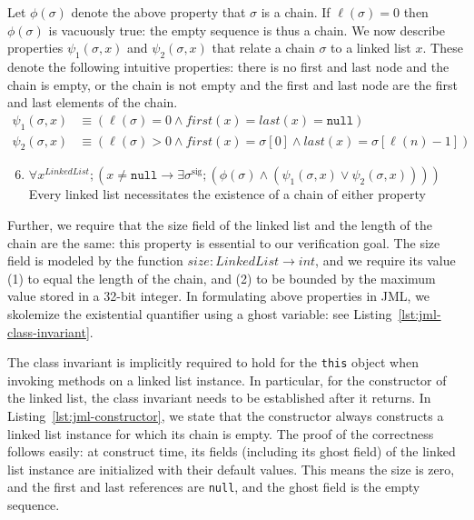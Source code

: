 \documentclass[runningheads]{llncs}
\begin{document}
Let $\phi(\sigma)$ denote the above property that $\sigma$ is a chain. If $\ell(\sigma)=0$ then $\phi(\sigma)$ is vacuously true: the empty sequence is thus a chain. We now describe properties $\psi_1(\sigma,x)$ and $\psi_2(\sigma,x)$ that relate a chain $\sigma$ to a linked list $x$. These denote the following intuitive properties: there is no first and last node and the chain is empty, or the chain is not empty and the first and last node are the first and last elements of the chain. \begin{equation*}
\begin{split}
\psi_1(\sigma,x) & \equiv (\ell(\sigma) = 0 \land \mathit{first}(x) = \mathit{last}(x) = \mathtt{null}) \\
\psi_2(\sigma,x) & \equiv (\ell(\sigma) > 0 \land \mathit{first}(x) = \sigma[0] \land \mathit{last}(x) = \sigma[\ell(n)-1])
\end{split}
\end{equation*}
\begin{enumerate}\setcounter{enumi}{5}
    \item $\forall x^\mathit{LinkedList}; (x \neq \mathtt{null}\to \exists \sigma^\mathrm{sig}; (\phi(\sigma) \land (\psi_1(\sigma,x)\lor\psi_2(\sigma,x))))$\\
    Every linked list necessitates the existence of a chain of either property
\end{enumerate}

Further, we require that the size field of the linked list and the length of the chain are the same: this property is essential to our verification goal. The size field is modeled by the function $\mathit{size}: \mathit{LinkedList}\to \mathit{int}$, and we require its value (1) to equal the length of the chain, and (2) to be bounded by the maximum value stored in a 32-bit integer. In formulating above properties in JML, we skolemize the existential quantifier using a ghost variable: see Listing~\ref{lst:jml-class-invariant}.



The class invariant is implicitly required to hold for the \texttt{this} object when invoking methods on a linked list instance. In particular, for the constructor of the linked list, the class invariant needs to be established after it returns. In Listing~\ref{lst:jml-constructor}, we state that the constructor always constructs a linked list instance for which its chain is empty. The proof of the correctness follows easily: at construct time, its fields (including its ghost field) of the linked list instance are initialized with their default values. This means the size is zero, and the first and last references are \texttt{null}, and the ghost field is the empty sequence.
\end{document}
